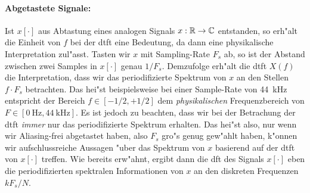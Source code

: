 \paragraph{Abgetastete Signale:} Ist $x[\cdot]$ aus Abtastung eines analogen Signals $x: \mathbb{R} \rightarrow \mathbb{C}$ entstanden, so erh"alt die Einheit von $f$ bei der \gls{dtft} eine Bedeutung, da dann  eine physikalische Interpretation zul"asst.
    Tasten wir $x$ mit Sampling-Rate $F_s$ ab, so ist der Abstand zwischen zwei Samples in $x[\cdot]$ genau $1/F_s$.
    Demzufolge erh"alt die \gls{dtft} $X(f)$ die Interpretation, dass wir das periodifizierte Spektrum von $x$ an den Stellen $f \cdot F_s$ betrachten.
    Das hei"st beispielsweise bei einer Sample-Rate von \SI{44}{\kilo\hertz} entspricht der Bereich $f \in [-1/2,+1/2]$ dem \emph{physikalischen} Frequenzbereich von $F \in [\SI{0}{\hertz},\SI{44}{\kilo\hertz}]$.
    Es ist jedoch zu beachten, dass wir bei der Betrachung der \gls{dtft} \emph{immer} nur das periodifizierte Spektrum erhalten. 
    Das hei"st also, nur wenn wir Aliasing-frei abgetastet haben, also $F_s$ gro"s genug gew"ahlt haben, k"onnen wir aufschlussreiche Aussagen "uber das Spektrum von $x$ basierend auf der \gls{dtft} von $x[\cdot]$ treffen.
    Wie bereits erw"ahnt, ergibt dann die \gls{dft} des Signals $x[\cdot]$ eben die periodifizierten spektralen Informationen von $x$ an den diskreten Frequenzen $k F_s/N$.

%
